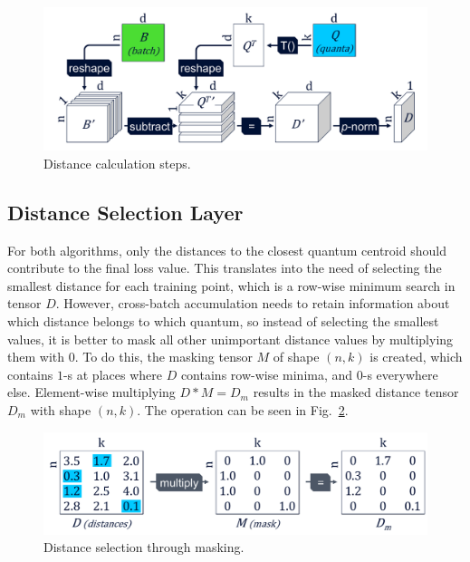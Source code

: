 			\begin{figure}[ht]
				\centering
				\includegraphics[width=0.75\linewidth]{figures/03_quantization/distance_calc/distance_calc.pdf}
				\caption[Neural-net-based \kmeans{} and BSQ distance calculation]{Distance calculation steps.}
				\label{fig:distance_calc}
			\end{figure}
			
		\subsection{Distance Selection Layer}
			
			For both algorithms, only the distances to the closest quantum centroid should contribute to the final loss value.
			This translates into the need of selecting the smallest distance for each training point, which is a row-wise minimum search in tensor $D$.
			However, cross-batch accumulation needs to retain information about which distance belongs to which quantum, so instead of selecting the smallest values, it is better to mask all other unimportant distance values by multiplying them with $0$.
			To do this, the masking tensor $M$ of shape $(n, k)$ is created, which contains $1$-s at places where $D$ contains row-wise minima, and $0$-s everywhere else.
			Element-wise multiplying $D * M = D_m$ results in the masked distance tensor $D_m$ with shape $(n, k)$.
			The operation can be seen in Fig.~\ref{fig:distance_select}.
			
			\begin{figure}[ht]
				\centering
				\includegraphics[width=0.75\linewidth]{figures/03_quantization/distance_select/distance_select.pdf}
				\caption[Neural-net-based \kmeans{} and BSQ distance selection]{Distance selection through masking.}
				\label{fig:distance_select}
			\end{figure}
			
